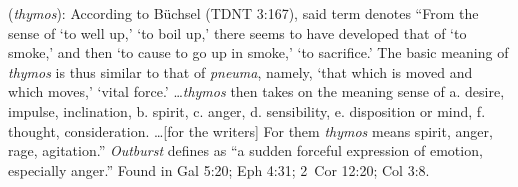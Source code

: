 \item[Outburst,]

(\textit{thymos}):
According to Büchsel (TDNT 3:167), said term denotes ``From the sense of `to well up,' `to boil up,' there seems to have developed that of `to smoke,' and then `to cause to go up in smoke,' `to sacrifice.' The basic meaning of \emph{thymos} is thus similar to that of \emph{pneuma}, namely, `that which is moved and which moves,' `vital force.' \ldots \emph{thymos} then takes on the meaning sense of a. desire, impulse, inclination, b. spirit, c. anger, d. sensibility, e. disposition or mind, f. thought, consideration. \ldots [for the writers] For them \emph{thymos} means spirit, anger, rage, agitation.'' \emph{Outburst} defines as ``a sudden forceful expression of emotion, especially anger.''
Found in Gal 5:20; Eph 4:31; 2~Cor 12:20; Col 3:8.
